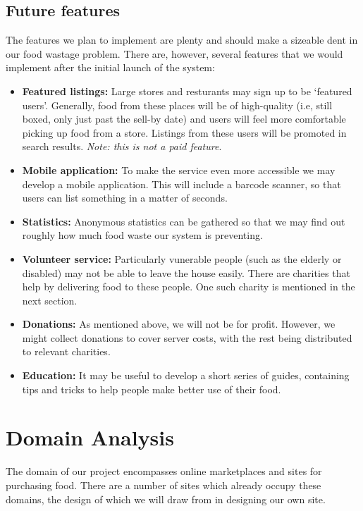 \documentclass[12pt]{article}
\begin{document}
\subsection{Future features}
The features we plan to implement are plenty and should make a sizeable dent in our food wastage problem. There are, however, several features
that we would implement after the initial launch of the system:
\begin{itemize}
	\item \textbf{Featured listings:} Large stores and resturants may sign up to be `featured users'. Generally, food from these places will be of high-quality
		(i.e, still boxed, only just past the sell-by date) and users will feel more comfortable picking up food from a store. Listings from these users will
		be promoted in search results. \textit{Note: this is not a paid feature}.
	\item \textbf{Mobile application:} To make the service even more accessible we may develop a mobile application. This will include a barcode scanner, so that users
		can list something in a matter of seconds.
	\item \textbf{Statistics:} Anonymous statistics can be gathered so that we may find out roughly how much food waste our system is preventing.
	\item \textbf{Volunteer service:} Particularly vunerable people (such as the elderly or disabled) may not be able to leave the house easily. There are charities
		that help by delivering food to these people. One such charity is mentioned in the next section.
	\item \textbf{Donations:} As mentioned above, we will not be for profit. However, we might collect donations to cover server costs, with the rest being distributed
		to relevant charities.
	\item \textbf{Education:} It may be useful to develop a short series of guides, containing tips and tricks to help people make better use of their food.
\end{itemize}


\section{Domain Analysis}

The domain of our project encompasses online marketplaces and sites for purchasing food.
There are a number of sites which already occupy these domains,
the design of which we will draw from in designing our own site.
\end{document}
